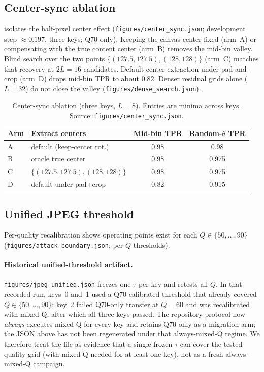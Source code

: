 \documentclass[11pt,a4paper]{article}
\begin{document}
\subsection{Center-sync ablation}
\label{sec:center}

 isolates the half-pixel center effect
(\texttt{figures/center\_sync.json}; development step \(\approx 0.197\), three keys;
Q70-only).
Keeping the canvas center fixed (arm~A) or compensating with the true content center
(arm~B) removes the mid-bin valley.
Blind search over the two points
\(\{(127.5,127.5),(128,128)\}\) (arm~C) matches that recovery at \(2L=16\)
candidates.
Default-center extraction under pad-and-crop (arm~D) drops mid-bin TPR to about
\(0.82\).
Denser residual grids alone (\(L=32\)) do not close the valley
(\texttt{figures/dense\_search.json}).

\begin{table}[t]
\centering
\caption{Center-sync ablation (three keys, \(L=8\)).
Entries are minima across keys.
Source: \texttt{figures/center\_sync.json}.}
\label{tab:center-sync}
\begin{tabular}{@{}llcc@{}}
\toprule
Arm & Extract centers & Mid-bin TPR & Random-\(\theta\) TPR \\
\midrule
A & default (keep-center rot.) & 0.98 & 0.98 \\
B & oracle true center & 0.98 & 0.975 \\
C & \(\{(127.5,127.5),(128,128)\}\) & 0.98 & 0.975 \\
D & default under pad+crop & 0.82 & 0.915 \\
\bottomrule
\end{tabular}
\end{table}

\subsection{Unified JPEG threshold}
\label{sec:jpeg}

Per-quality recalibration shows operating points exist for each
\(Q\in\{50,\ldots,90\}\) (\texttt{figures/attack\_boundary.json}; per-\(Q\)
thresholds).

\paragraph{Historical unified-threshold artifact.}
\texttt{figures/jpeg\_unified.json} freezes one \(\tau\) per key and retests all
\(Q\).
In that recorded run, keys~0 and~1 used a Q70-calibrated threshold that already
covered \(Q\in\{50,\ldots,90\}\); key~2 failed Q70-only transfer at \(Q=60\) and was
recalibrated with mixed-Q, after which all three keys passed.
The repository protocol now \emph{always} executes mixed-Q for every key and retains
Q70-only as a migration arm; the JSON above has not been regenerated under that
always-mixed-Q regime.
We therefore treat the file as evidence that a single frozen \(\tau\) can cover the
tested quality grid (with mixed-Q needed for at least one key), not as a fresh
always-mixed-Q campaign.
\end{document}
